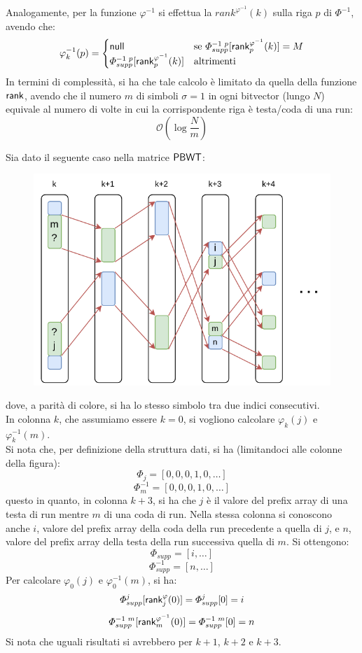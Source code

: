 Analogamente, per la funzione $\varphi^{-1}$ si effettua la
$rank^{\varphi^{-1}}(k)$ 
sulla riga $p$ di $\varPhi^{-1}$, avendo che:
\[\varphi_k^{-1}(p)=
  \begin{cases}
    \mbox{\rm {\sf null}}&\mbox{se }\varPhi^{-1\,\,p}_{supp}[\mbox{\rm {\sf rank}}^{\varphi^{-1}}_p(k)]=M\\
    \varPhi^{-1\,\,p}_{supp}[\mbox{\rm {\sf rank}}^{\varphi^{-1}}_p(k)]&\mbox{altrimenti }
  \end{cases}
\]
In termini di complessità, si ha che tale calcolo è limitato da quella 
della funzione $\mbox{\rm {\sf rank}}$, avendo che il numero $m$ di simboli $\sigma=1$ in ogni
bitvector (lungo $N$) equivale al numero di volte in cui la corrispondente riga
è testa/coda di una run: 
\begin{equation}
  \label{eq:queryphi}
  \mathcal{O}\left(\log\frac{N}{m}\right)
\end{equation}
\begin{esempio}
  Sia dato il seguente caso nella matrice $\mbox{\rm {\sf PBWT}}$:
  \begin{figure}[H]
    \centering
    \includegraphics[scale = 0.8]{img/phi.pdf}   
  \end{figure}
  \noindent
  dove, a parità di colore, si ha lo stesso simbolo tra due indici
  consecutivi. \\
  In colonna $k$, che assumiamo essere $k=0$, si vogliono calcolare
  $\varphi_k(j)$ e $\varphi^{-1}_k(m)$. \\
  Si nota che, per definizione della struttura dati, si ha (limitandoci alle
  colonne della figura):
  \[\varPhi_j=[0,0,0,1,0, \ldots]\]
  \[\varPhi^{-1}_m=[0,0,0,1,0,\ldots]\]
  questo in quanto, 
  in colonna $k+3$, si ha che $j$ è il valore del prefix array di una testa di
  run 
  mentre $m$ di una coda di run. Nella stessa colonna si conoscono anche
  $i$, valore del prefix array della coda della run precedente
  a quella di $j$, e $n$, valore del prefix array della testa della run
  successiva quella di $m$. Si ottengono:
  \[\varPhi_{supp}=[i,\ldots]\]
  \[\varPhi^{-1}_{supp}=[n,\ldots]\]
  Per calcolare $\varphi_0(j)$ e  $\varphi^{-1}_0(m)$, si ha:
  \[\varPhi_{supp}^j[\mbox{\rm {\sf rank}}^\varphi_j(0)]=\varPhi_{supp}^j[0]=i\]
  \[\varPhi^{-1\,\,m}_{supp}[\mbox{\rm {\sf rank}}^{\varphi^{-1}}_m(0)]=\varPhi^{-1\,\,m}_{supp}[0]=n\]
  Si nota che uguali risultati si avrebbero per $k+1$, $k+2$ e $k+3$.
\end{esempio}

